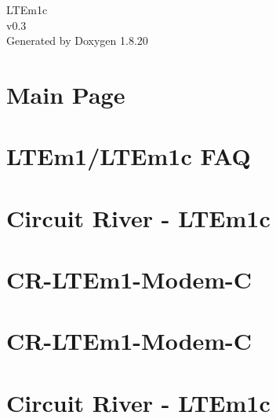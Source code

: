 \let\mypdfximage\pdfximage\def\pdfximage{\immediate\mypdfximage}\documentclass[twoside]{book}
\newcommand{\+}{\discretionary{\mbox{\scriptsize$\hookleftarrow$}}{}{}}
\newcommand{\clearemptydoublepage}{%
  \newpage{\pagestyle{empty}\cleardoublepage}%
}
\begin{document}
\hypersetup{pageanchor=false,
             bookmarksnumbered=true,
             pdfencoding=unicode
            }
\begin{titlepage}
\vspace*{7cm}
\begin{center}%
{\Large L\+T\+Em1c \\[1ex]\large v0.\+3 }\\
\vspace*{1cm}
{\large Generated by Doxygen 1.8.20}\\
\end{center}
\end{titlepage}
\clearemptydoublepage
{}
\tableofcontents
\clearemptydoublepage
{}
\hypersetup{pageanchor=true}

\chapter{Main Page}
\label{index}\hypertarget{index}{}
\chapter{L\+T\+Em1/\+L\+T\+Em1c F\+AQ}
\label{md__l_t_em1-_f_a_q}

\chapter{Circuit River -\/ L\+T\+Em1c}
\label{md__r_e_a_d_m_e}

\chapter{C\+R-\/\+L\+T\+Em1-\/\+Modem-\/C}
\label{md_tests__l_t_em1c-1-platform__r_e_a_d_m_e}

\chapter{C\+R-\/\+L\+T\+Em1-\/\+Modem-\/C}
\label{md_tests__l_t_em1c-2-components__r_e_a_d_m_e}

\chapter{Circuit River -\/ L\+T\+Em1c}
\label{md_tests__l_t_em1c-8-mqtt__r_e_a_d_m_e}

\end{document}
